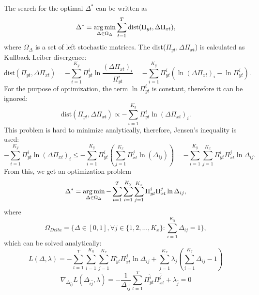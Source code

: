 The search for the optimal $\Delta^{*}$ can be written as
\begin{equation}
    \Delta^* = \operatorname*{arg\,min}_{\Delta \in \Omega_{\Delta}} \sum_{t=1}^T \text{dist}(\Pi_{yt}, \Delta\Pi_{xt}),
\end{equation}
where $\Omega_{\Delta}$ is a set of left stochastic matrices. The dist($\Pi_{yt}, \Delta\Pi_{xt}$) is calculated as Kullback-Leiber divergence\cite{Kullback1951}:
\begin{equation}
    \text{dist}(\Pi_{yt}, \Delta\Pi_{xt}) = - \sum_{i=1}^{K_y} \Pi_{yt}^i \ln\frac{(\Delta\Pi_{xt})_i}{\Pi_{yt}^i} = - \sum_{i=1}^{K_y} \Pi_{yt}^i (\ln (\Delta\Pi_{xt})_i - \ln \Pi_{yt}^i).
\end{equation}
For the purpose of optimization, the term $\ln \Pi_{yt}^i$ is constant, therefore it can be ignored:
\begin{equation}
    \text{dist}(\Pi_{yt}, \Delta\Pi_{xt}) \propto - \sum_{i=1}^{K_y} \Pi_{yt}^i \ln (\Delta\Pi_{xt})_i.
\end{equation}
This problem is hard to minimize analytically, therefore, Jensen's inequality is used:
\begin{equation}
    - \sum_{i=1}^{K_y} \Pi_{yt}^i \ln (\Delta\Pi_{xt})_i \leq - \sum_{i=1}^{K_y} \Pi_{yt}^i ( \sum_{j=1}^{K_x} \Pi_{xt}^j \ln (\Delta_{ij}) ) = - \sum_{i=1}^{K_y} \sum_{j=1}^{K_x} \Pi_{yt}^i \Pi_{xt}^j \ln \Delta_{ij}.
\end{equation}
From this, we get an optimization problem
\begin{equation}
    \Delta^* = \operatorname*{arg\,min}_{\Delta \in \Omega_{\Delta}} - \sum_{t=1}^T \sum_{i=1}^{K_y} \sum_{j=1}^{K_x} \Pi_{yt}^i \Pi_{xt}^j \ln \Delta_{ij},
\end{equation}
where
\begin{equation}
    \Omega_{Delta} = \{ \Delta \in [0, 1], \forall j \in \{ 1, 2, \dots, K_x \} : \sum_{i=1}^{K_y} \Delta_{ij} = 1 \},
\end{equation}
which can be solved analytically:
\begin{equation}
    L(\Delta, \lambda) = - \sum_{t=1}^T \sum_{i=1}^{K_y} \sum_{j=1}^{K_x} \Pi_{yt}^i \Pi_{xt}^j \ln \Delta_{ij} + \sum_{j=1}^{K_x} \lambda_j (\sum_{i=1}^{K_y} \Delta_{ij} - 1)
\end{equation}
\begin{equation}
    \nabla_{\Delta_{\hat{i}\hat{j}}} L(\Delta_{\hat{i}\hat{j}}, \lambda) = - \frac{1}{\Delta_{\hat{i}\hat{j}}} \sum_{t=1}^{T} \Pi_{yt}^{\hat{i}} \Pi_{xt}^{\hat{j}} + \lambda_{\hat{j}} = 0
\end{equation}

